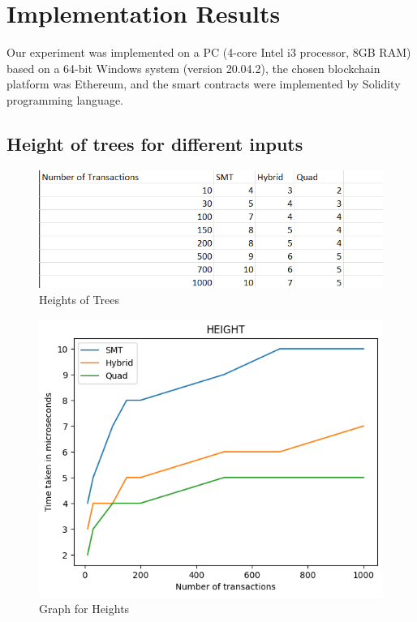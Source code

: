 \section{Implementation Results}
Our experiment was implemented on a PC (4-core Intel i3 processor, 8GB RAM) based on a 64-bit Windows system (version 20.04.2), the chosen blockchain platform was Ethereum, and the smart contracts were implemented by Solidity programming language.\vspace{0.5cm}

\subsection{Height of trees for different inputs}

\begin{figure}[H]
    \centering
    \includegraphics[scale=0.8]{figures/Height of trees.png}
    \caption{Heights of Trees}
 
\end{figure}
\vspace{0.5cm}

\vspace{0.5cm}
\begin{figure}[H]
    \centering
    \includegraphics[scale=0.8]{figures/Graphs for Heights.png}
    \caption{Graph for Heights}
 
\end{figure}
\vspace{0.5cm}


